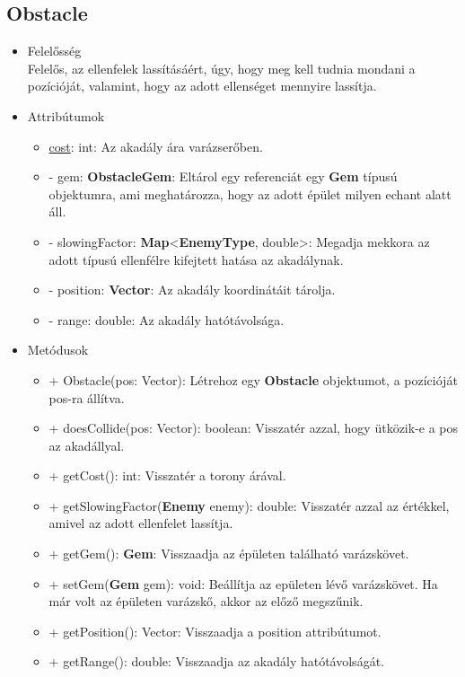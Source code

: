 \subsection{Obstacle}
\begin{itemize}
\item Felelősség\\
Felelős, az ellenfelek lassításáért, úgy, hogy meg kell tudnia mondani a pozícióját, valamint, hogy az adott ellenséget mennyire lassítja.
\item Attribútumok
	\begin{itemize}
		\item \underline{cost}: int: Az akadály ára varázserőben.
		\item - gem: \textbf{ObstacleGem}: Eltárol egy referenciát egy \textbf{Gem} típusú objektumra, ami meghatározza, hogy az adott épület milyen echant alatt áll.
		\item - slowingFactor: \textbf{Map}<\textbf{EnemyType}, double>: Megadja mekkora az adott típusú ellenfélre kifejtett hatása az akadálynak.
		\item - position: \textbf{Vector}: Az akadály koordinátáit tárolja.
		\item - range: double: Az akadály hatótávolsága.
	\end{itemize}
\item Metódusok
	\begin{itemize}
		\item + Obstacle(pos: Vector): Létrehoz egy \textbf{Obstacle} objektumot, a pozícióját pos-ra állítva.
		\item + doesCollide(pos: Vector): boolean: Visszatér azzal, hogy ütközik-e a pos az akadállyal.
		\item + getCost(): int: Visszatér a torony árával.
		\item + getSlowingFactor(\textbf{Enemy} enemy): double: Visszatér azzal az értékkel, amivel az adott ellenfelet lassítja.
		\item + getGem(): \textbf{Gem}: Visszaadja az épületen található varázskövet.
		\item + setGem(\textbf{Gem} gem): void: Beállítja az epületen lévő varázskövet. Ha már volt az épületen varázskő, akkor az előző megszűnik.
		\item + getPosition(): Vector: Visszaadja a position attribútumot.
		\item + getRange(): double: Visszaadja az akadály hatótávolságát.
	\end{itemize}
\end{itemize}


